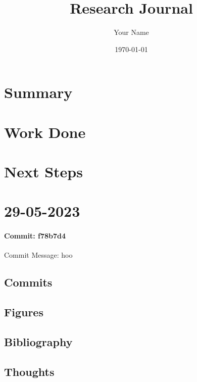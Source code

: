 \documentclass{article}
\begin{document}
\title{Research Journal}
\author{Your Name}
\date{\today}

\maketitle

\section{Summary}

\section{Work Done}

\section{Next Steps}


\section{29-05-2023}
\paragraph{Commit: f78b7d4}

Commit Message: hoo

\subsection{Commits}
\subsection{Figures}
\subsection{Bibliography}
\subsection{Thoughts}
\end{document}
